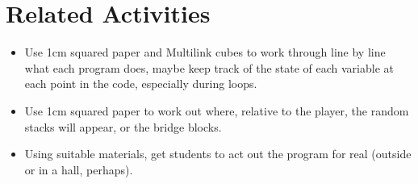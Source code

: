 \documentclass{geocraft-lesson-plan}
\begin{document}
\section*{Related Activities}
\begin{itemize}
\item Use 1cm squared paper and Multilink cubes to work through line by line what each program does, maybe keep track of
  the state of each variable at each point in the code, especially during loops.
\item Use 1cm squared paper to work out where, relative to the player, the random stacks will appear, or the bridge
  blocks.
\item Using suitable materials, get students to act out the program for real (outside or in a hall, perhaps).

\end{itemize}
\end{document}
